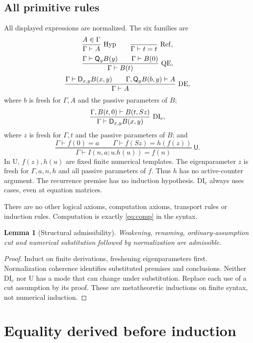 \documentclass[11pt]{article}
\newtheorem{lemma}[theorem]{Lemma}
\newcommand{\Q}{\mathsf Q}\newcommand{\D}{\mathsf D}
\newcommand{\U}{\mathsf U}\newcommand{\nf}{\operatorname{nf}}
\begin{document}
\subsection{All primitive rules}
All displayed expressions are normalized. The six families are
\[
 \frac{A\in\Gamma}{\Gamma\vdash A}\ {\rm Hyp}
 \qquad
 \frac{\ }{\Gamma\vdash t=t}\ {\rm Ref},
\]
\[
 \frac{\Gamma\vdash\Q_yB(y)\qquad\Gamma\vdash B(0)}
      {\Gamma\vdash B(t)}\ {\rm QE},
\]
\[
 \frac{\Gamma\vdash\D_{x,y}B(x,y)\qquad
       \Gamma,\Q_yB(b,y)\vdash A}
      {\Gamma\vdash A}\ {\rm DE},
\]
where $b$ is fresh for $\Gamma,A$ and the passive parameters of $B$;
\[
 \frac{\Gamma,B(t,0)\vdash B(t,Sz)}
      {\Gamma\vdash\D_{x,y}B(x,y)}\ {\rm DI_c},
\]
where $z$ is fresh for $\Gamma,t$ and the passive parameters of $B$; and
\[
 \boxed{\quad
 \frac{\Gamma\vdash f(0)=a\qquad
       \Gamma\vdash f(Sz)=h(f(z))}
      {\Gamma\vdash I(n,a;u.h(u))=f(n)}\ \U .
 \quad}                                                \tag{U}\label{eq:U}
\]
In U, $f(z),h(u)$ are fixed finite numerical templates. The eigenparameter
$z$ is fresh for $\Gamma,a,n,h$ and all passive parameters of $f$.
Thus $h$ has no active-counter argument. The recurrence premise has no
induction hypothesis. DI$_c$ always uses cases, even at equation matrices.

There are no other logical axioms, computation axioms, transport rules
or induction rules. Computation is exactly \eqref{eq:comp} in the syntax.

\begin{lemma}[Structural admissibility]
Weakening, renaming, ordinary-assumption cut and numerical substitution
followed by normalization are admissible.
\end{lemma}
\begin{proof}
Induct on finite derivations, freshening eigenparameters first.
Normalization coherence identifies substituted premises and conclusions.
Neither DI$_c$ nor U has a mode that can change under substitution.
Replace each use of a cut assumption by its proof. These are
metatheoretic inductions on finite syntax, not numerical induction.
\end{proof}

\section{Equality derived before induction}\label{sec:equality}
\end{document}
